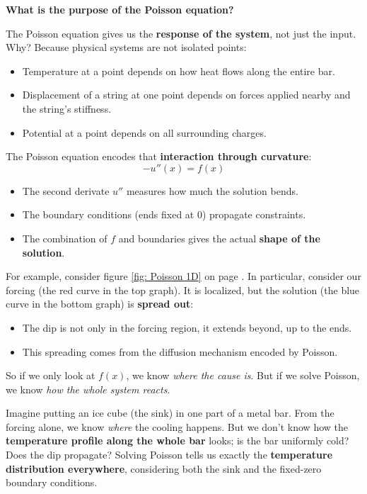 \newpage

\begin{flushleft}
    \textcolor{Green3}{ \textbf{What is the purpose of the Poisson equation?}}
\end{flushleft}
The Poisson equation gives us the \textbf{response of the system}, not just the input. Why? Because physical systems are not isolated points:
\begin{itemize}
    \item Temperature at a point depends on how heat flows along the entire bar.
    \item Displacement of a string at one point depends on forces applied nearby and the string's stiffness.
    \item Potential at a point depends on all surrounding charges.
\end{itemize}
The Poisson equation encodes that \textbf{interaction through curvature}:
\begin{equation*}
    - u''(x) = f(x)
\end{equation*}
\begin{itemize}
    \item The second derivate $u''$ measures how much the solution bends.
    \item The boundary conditions (ends fixed at 0) propagate constraints.
    \item The combination of $f$ and boundaries gives the actual \textbf{shape of the solution}.
\end{itemize}
For example, consider figure \ref{fig: Poisson 1D} on page \pageref{fig: Poisson 1D}. In particular, consider our forcing (the red curve in the top graph). It is localized, but the solution (the blue curve in the bottom graph) is \textbf{spread out}:
\begin{itemize}
    \item The dip is not only in the forcing region, it extends beyond, up to the ends.
    \item This spreading comes from the diffusion mechanism encoded by Poisson.
\end{itemize}
So if we only look at $f(x)$, we know \emph{where the cause is}. But if we solve Poisson, we know \emph{how the whole system reacts}.

\begin{examplebox}
    Imagine putting an ice cube (the sink) in one part of a metal bar. From the forcing alone, we know \emph{where} the cooling happens. But we don't know how the \textbf{temperature profile along the whole bar} looks; is the bar uniformly cold? Does the dip propagate? Solving Poisson tells us exactly the \textbf{temperature distribution everywhere}, considering both the sink and the fixed-zero boundary conditions.
\end{examplebox}